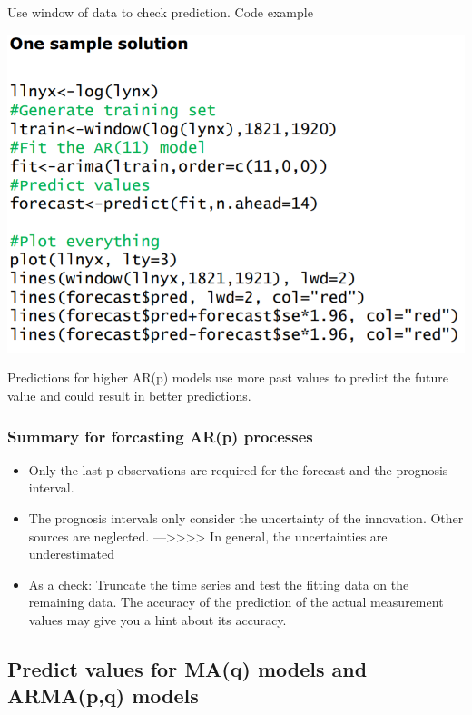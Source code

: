 \documentclass[
]{article}
\providecommand{\tightlist}{%
  \setlength{\itemsep}{0pt}\setlength{\parskip}{0pt}}
\begin{document}
Use window of data to check prediction. Code example

\includegraphics[width=1\linewidth]{window}

Predictions for higher AR(p) models use more past values to predict the
future value and could result in better predictions.

\hypertarget{summary-for-forcasting-arp-processes}{%
\subsubsection{Summary for forcasting AR(p)
processes}\label{summary-for-forcasting-arp-processes}}

\begin{itemize}
\tightlist
\item
  Only the last p observations are required for the forecast and the
  prognosis interval.
\item
  The prognosis intervals only consider the uncertainty of the
  innovation. Other sources are neglected.
  ---\textgreater\textgreater\textgreater\textgreater{} In general, the
  uncertainties are underestimated
\item
  As a check: Truncate the time series and test the fitting data on the
  remaining data. The accuracy of the prediction of the actual
  measurement values may give you a hint about its accuracy.
\end{itemize}

\hypertarget{predict-values-for-maq-models-and-armapq-models}{%
\subsection{Predict values for MA(q) models and ARMA(p,q)
models}\label{predict-values-for-maq-models-and-armapq-models}}
\end{document}
